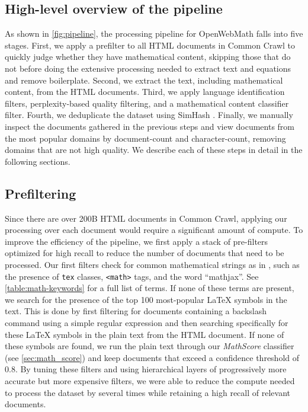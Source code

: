 \subsection{High-level overview of the pipeline}

As shown in \autoref{fig:pipeline}, the processing pipeline for OpenWebMath falls into five stages. First, we apply a prefilter to all HTML documents in Common Crawl to quickly judge whether they have mathematical content, skipping those that do not before doing the extensive processing needed to extract text and equations and remove boilerplate. Second, we extract the text, including mathematical content, from the HTML documents. Third, we apply language identification filters, perplexity-based quality filtering, and a mathematical content classifier filter. Fourth, we deduplicate the dataset using SimHash \citep{manku2007near}. Finally, we manually inspect the documents gathered in the previous steps and view documents from the most popular domains by document-count and character-count, removing domains that are not high quality. We describe each of these steps in detail in the following sections.

\subsection{Prefiltering}

Since there are over 200B HTML documents in Common Crawl, applying our processing over each document would require a significant amount of compute. To improve the efficiency of the pipeline, we first apply a stack of pre-filters optimized for high recall to reduce the number of documents that need to be processed. Our first filters check for common mathematical strings as in \citet{lewkowycz2022solving}, such as the presence of \texttt{tex} classes, \texttt{<math>} tags, and the word ``mathjax''. See \autoref{table:math-keywords} for a full list of terms. If none of these terms are present, we search for the presence of the top 100 most-popular \LaTeX{} symbols in the text. This is done by first filtering for documents containing a backslash command using a simple regular expression and then searching specifically for these \LaTeX{} symbols in the plain text from the HTML document. If none of these symbols are found, we run the plain text through our \textit{MathScore} classifier (see \autoref{sec:math_score}) and keep documents that exceed a confidence threshold of 0.8. By tuning these filters and using hierarchical layers of progressively more accurate but more expensive filters, we were able to reduce the compute needed to process the dataset by several times while retaining a high recall of relevant documents.

